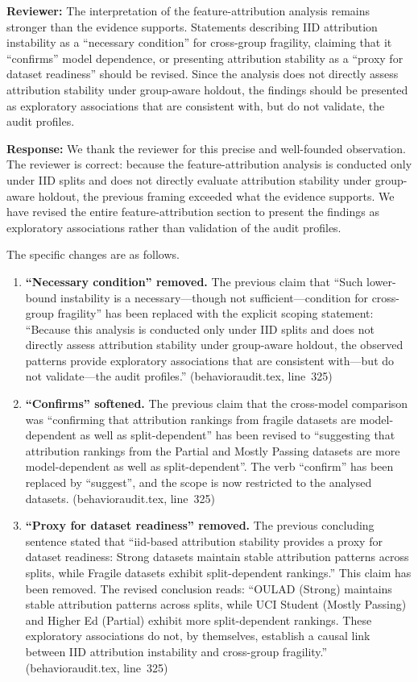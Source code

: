 \documentclass[10pt,letterpaper]{article}
\begin{document}
\textbf{Reviewer:} The interpretation of the feature-attribution analysis
remains stronger than the evidence supports. Statements describing IID
attribution instability as a ``necessary condition'' for cross-group
fragility, claiming that it ``confirms'' model dependence, or presenting
attribution stability as a ``proxy for dataset readiness'' should be
revised. Since the analysis does not directly assess attribution
stability under group-aware holdout, the findings should be presented as
exploratory associations that are consistent with, but do not validate,
the audit profiles.

\textbf{Response:} We thank the reviewer for this precise and
well-founded observation. The reviewer is correct: because the
feature-attribution analysis is conducted only under IID splits and does
not directly evaluate attribution stability under group-aware holdout,
the previous framing exceeded what the evidence supports. We have
revised the entire feature-attribution section to present the findings
as exploratory associations rather than validation of the audit
profiles.

The specific changes are as follows.

\begin{enumerate}
\item \textbf{``Necessary condition'' removed.}  The previous claim that
  ``Such lower-bound instability is a necessary---though not
  sufficient---condition for cross-group fragility'' has been replaced
  with the explicit scoping statement: ``Because this analysis is
  conducted only under IID splits and does not directly assess
  attribution stability under group-aware holdout, the observed patterns
  provide exploratory associations that are consistent with---but do not
  validate---the audit profiles.''  (behavioraudit.tex, line~325)

\item \textbf{``Confirms'' softened.}  The previous claim that the
  cross-model comparison was ``confirming that attribution rankings from
  fragile datasets are model-dependent as well as split-dependent'' has
  been revised to ``suggesting that attribution rankings from the
  Partial and Mostly Passing datasets are more model-dependent as well
  as split-dependent''.  The verb ``confirm'' has been replaced by
  ``suggest'', and the scope is now restricted to the analysed
  datasets.  (behavioraudit.tex, line~325)

\item \textbf{``Proxy for dataset readiness'' removed.}  The previous
  concluding sentence stated that ``iid-based attribution stability
  provides a proxy for dataset readiness: Strong datasets maintain
  stable attribution patterns across splits, while Fragile datasets
  exhibit split-dependent rankings.''  This claim has been removed.
  The revised conclusion reads: ``OULAD (Strong) maintains stable
  attribution patterns across splits, while UCI Student (Mostly
  Passing) and Higher Ed (Partial) exhibit more split-dependent
  rankings.  These exploratory associations do not, by themselves,
  establish a causal link between IID attribution instability and
  cross-group fragility.''  (behavioraudit.tex, line~325)
\end{enumerate}
\end{document}

